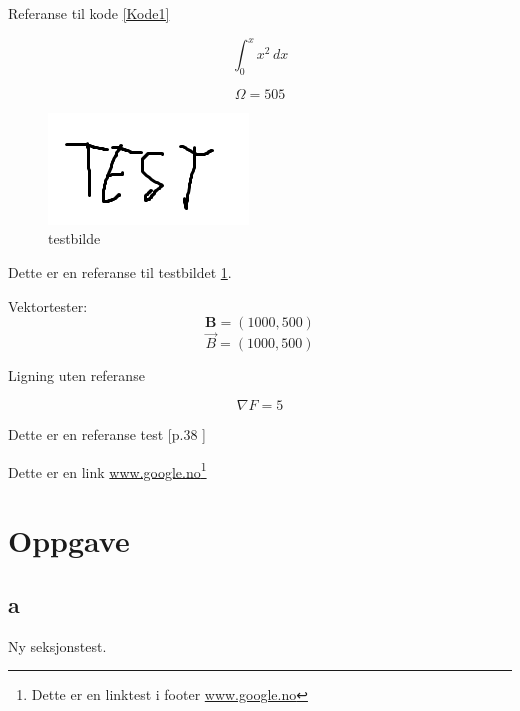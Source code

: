 \documentclass[12pt]{article}
\newcommand{\vect}[1]{\boldsymbol{#1}}
\begin{document}
{Referanse til kode \ref{Kode1}


\begin{equation}
    \int_{0}^{x} x^{2} \, dx
\end{equation}


\begin{equation}
    \Omega = 505
\end{equation}


\begin{figure}[hbt!]
    {\centering
    \includegraphics{test.png}
    \caption{testbilde}
    \label{test_image}
    \par}
\end{figure}

Dette er en referanse til testbildet \ref{test_image}.


\newpage
Vektortester:
\begin{equation}
    \vect{B} = (1000,500)
\end{equation}
\begin{equation}
    \vec{B} = (1000,500)
\end{equation}

Ligning uten referanse

\begin{equation*}
    \nabla F = 5
\end{equation*}

Dette er en referanse test [p.38 \cite{alpaydin_2014}]


Dette er en link \url{www.google.no}\footnote{Dette er en linktest i footer \url{www.google.no}}

\newpage

\section{Oppgave}
\subsection{a}

Ny seksjonstest.


}
\end{document}
